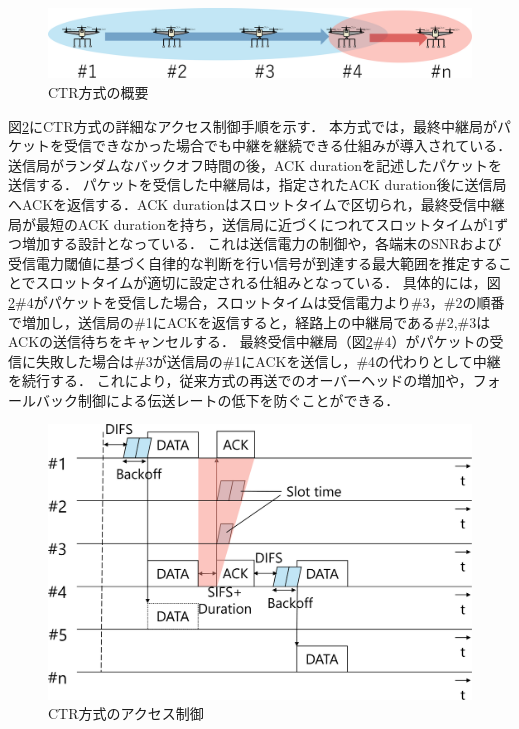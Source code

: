 \documentclass[a4paper,10.5pt]{ltjsarticle}
\begin{document}
\begin{figure}[H]
  \centering
  \includegraphics[width=\linewidth]{CTR_topology.pdf} %
  \caption{CTR方式の概要}
  \label{fig:CTR_topology} %
\end{figure}

図\ref{fig:CTR_accsess}にCTR方式の詳細なアクセス制御手順を示す．
本方式では，最終中継局がパケットを受信できなかった場合でも中継を継続できる仕組みが導入されている．
送信局がランダムなバックオフ時間の後，ACK durationを記述したパケットを送信する．
パケットを受信した中継局は，指定されたACK duration後に送信局へACKを返信する．ACK durationはスロットタイムで区切られ，最終受信中継局が最短のACK durationを持ち，送信局に近づくにつれてスロットタイムが1ずつ増加する設計となっている．
これは送信電力の制御や，各端末のSNRおよび受信電力閾値に基づく自律的な判断を行い信号が到達する最大範囲を推定することでスロットタイムが適切に設定される仕組みとなっている．
具体的には，図\ref{fig:CTR_accsess}\#4がパケットを受信した場合，スロットタイムは受信電力より\#3，\#2の順番で増加し，送信局の\#1にACKを返信すると，経路上の中継局である\#2,\#3はACKの送信待ちをキャンセルする．
最終受信中継局（図\ref{fig:CTR_accsess}\#4）がパケットの受信に失敗した場合は\#3が送信局の\#1にACKを送信し，\#4の代わりとして中継を続行する．
これにより，従来方式の再送でのオーバーヘッドの増加や，フォールバック制御による伝送レートの低下を防ぐことができる．
\begin{figure}[H]
  \centering
  \includegraphics[width=\linewidth]{CTR_accsess.pdf} %
  \caption{CTR方式のアクセス制御}
  \label{fig:CTR_accsess} %
\end{figure}
\end{document}
